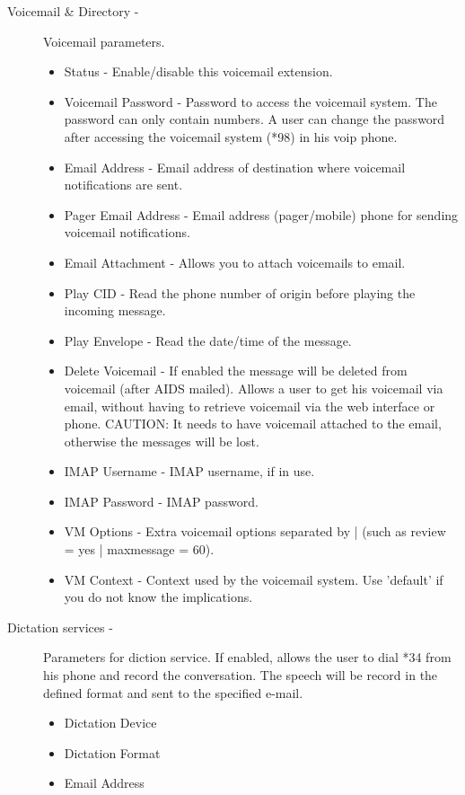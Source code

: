 \begin{description}
\begin{description}
            \item[Voicemail \& Directory -] Voicemail parameters.
                \begin{itemize}
                    \item Status - Enable/disable this voicemail extension.
                    \item Voicemail Password - Password to access the voicemail system. The password can only contain numbers. A user can change the password after accessing the voicemail system (*98) in his voip phone.
                    \item Email Address - Email address of destination where voicemail notifications are sent.
                    \item Pager Email Address - Email address (pager/mobile) phone for sending  voicemail notifications.
                    \item Email Attachment - Allows you to attach voicemails to email.
                    \item Play CID - Read the phone number of origin before playing the incoming message.
                    \item Play Envelope - Read the date/time of the message.
                    \item Delete Voicemail - If enabled the message will be deleted from voicemail (after AIDS mailed). Allows a user to get his voicemail via email, without having to retrieve voicemail via the web interface or phone. CAUTION: It needs to have voicemail attached to the email, otherwise the messages will be lost.
                    \item IMAP Username - IMAP username, if in use.
                    \item IMAP Password - IMAP password.
                    \item VM Options - Extra voicemail options separated by | (such as review = yes | maxmessage = 60).
                    \item VM Context - Context used by the voicemail system. Use 'default' if you do not know the implications.
                \end{itemize}

            \item[Dictation services -] Parameters for diction service. If enabled, allows the user to dial *34 from his phone and record the conversation. The speech will be record in the defined format and sent to the specified e-mail.
                \begin{itemize}
                    \item Dictation Device
                    \item Dictation Format
                    \item Email Address
                \end{itemize}


\end{description}
\end{description}
